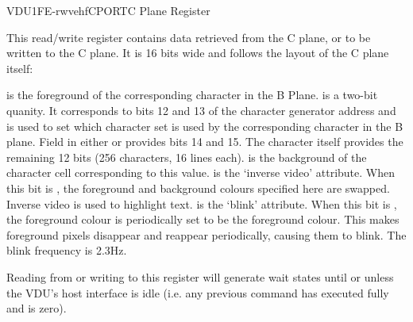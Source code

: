 \begin{ioport}{VDU}{1FE}{-rwvehf}{CPORT}{C Plane Register}

  This read/write register contains data retrieved from the C plane, or to be written to
  the C plane. It is 16 bits wide and follows the layout of the C plane itself:

  \begin{bitfield}
  \end{bitfield}

  \begin{description}
     is the foreground  of the
    corresponding character in the B Plane.
     is a two-bit quanity. It corresponds to bits 12 and 13
    of the character generator address and is used to set which character set
    is used by the corresponding character in the B plane. Field  in
    either  or  provides bits 14 and 15. The character
    itself provides the remaining 12 bits (256 characters, 16 lines each).
     is the background  of the character
    cell corresponding to this value.
     is the ‘inverse video’ attribute. When this bit is
    , the foreground and background colours specified here are
    swapped. Inverse video is used to highlight text.
     is the ‘blink’ attribute. When this bit is , the
    foreground colour is periodically set to be the foreground colour. This
    makes foreground pixels disappear and reappear periodically, causing them
    to blink. The blink frequency is 2.3Hz.
  \end{description}

  Reading from or writing to this register will generate wait states until or unless the VDU's
  host interface is idle (i.e. any previous command has executed fully and
   is zero). 

\end{ioport}


